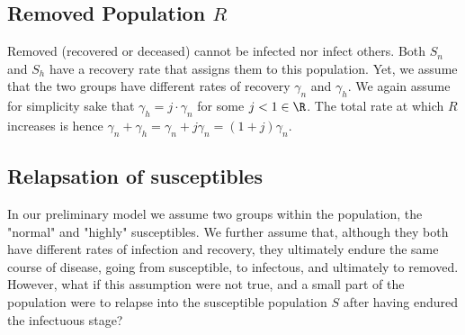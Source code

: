 \begin{multicols}{3}
\subsection{Removed Population $R$}
Removed (recovered or deceased) cannot be infected nor infect others. Both $S_n$ and $S_h$ have a recovery rate that assigns them to this population. Yet, we assume that the two groups have different rates of recovery $\gamma_n$ and $\gamma_h$. We again assume for simplicity sake that $\gamma_h = j\cdot\gamma_n$ for some $j < 1 \in \R$. The total rate at which $R$ increases is hence $\gamma_n + \gamma_h = \gamma_n + j\gamma_n = (1+j)\gamma_n$.
%
%
%
%
%
%
%
%
%
%
%

\subsection{Relapsation of susceptibles}
In our preliminary model we assume two groups within the population, the "normal" and "highly" susceptibles. We further assume that, although they both have different rates of infection and recovery, they ultimately endure the same course of disease, going from susceptible, to infectous, and ultimately to removed. However, what if this assumption were not true, and a small part of the population were to relapse into the susceptible population $S$ after having endured the infectuous stage? 


\end{multicols}
